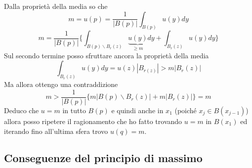 \documentclass[10pt,a4paper,twoside,openright]{book}
\begin{document}
\begin{dimostrazione}
\begin{figure}[H]
	\end{figure}
	\FloatBarrier
	
	Dalla proprietà della media so che 
	\begin{equation*}
		m=u(p) =\frac{1}{| B(p)| }\int _{B(p)} u(y) dy
	\end{equation*}
	\begin{equation*}
		m=\frac{1}{| B(p)| }\bigg\{\int _{B(p) \backslash B_{r}(z)}\underbrace{u(y)}_{\geqslant m} dy+\int _{B_{r}(z)} u(y) dy\bigg\}
	\end{equation*}
	Sul secondo termine posso sfruttare ancora la proprietà della media
	\begin{equation*}
		\int _{B_{r}(z)} u(y) dy=u(z)| B_{r(z)}|  >m| B_{r}(z)| 
	\end{equation*}
	Ma allora ottengo una contraddizione
	\begin{equation*}
		m >\frac{1}{| B(p)| }\{m| B(p) \backslash B_{r}(z)| +m| B_{r}(z)| \} =m
	\end{equation*}
	Deduco che $\displaystyle u=m$ in tutto $\displaystyle B(p)$ e quindi anche in $\displaystyle x_{1}$ (poiché $\displaystyle x_{j} \in B(x_{j-1})$) allora posso ripetere il ragionamento che ho fatto trovando $\displaystyle u=m$ in $\displaystyle B(x_{1})$ ed iterando fino all'ultima sfera trovo $\displaystyle u(q) =m$.
\end{dimostrazione}
\subsection{Conseguenze del principio di massimo}
\end{document}
